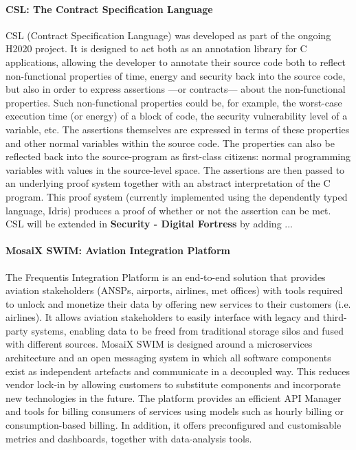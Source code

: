 \documentclass[a4paper,11pt]{article}
\newcommand{\project}[1]{\textbf{#1}\xspace}
\newcommand{\SECURITY}{\project{Security - Digital Fortress}}
\newcommand{\TheProject}{\SECURITY}
\begin{document}
\paragraph {\SAshort{} CSL: The Contract Specification Language}
CSL (Contract Specification Language) was developed as part of the ongoing H2020 \teamplay{} project. It is designed to act both as an annotation library for C applications, allowing the developer to annotate their source code both to reflect non-functional properties of time, energy and security back into the source code, but also in order to express assertions ---or contracts--- about the non-functional properties. Such non-functional properties could be, for example, the worst-case execution time (or energy) of a block of code, the security vulnerability level of a variable, etc. The assertions themselves are expressed in terms of these properties and other normal variables within the source code. The properties can also be reflected back into the source-program as first-class citizens: normal programming variables with values in the source-level space.
The assertions are then passed to an underlying proof system together with an abstract interpretation of the C program. This proof system (currently implemented using the dependently typed language, Idris) produces  a proof of whether or not the assertion can be met. CSL will be extended in \TheProject{} by adding ... 

\paragraph{\FRQshort{} MosaiX SWIM: Aviation Integration Platform}
\label{sec:swim}
The Frequentis Integration Platform is an end-to-end solution that provides aviation stakeholders (ANSPs, airports, airlines, met offices) with tools required to unlock and monetize their data by offering new services to their customers (i.e. airlines). It allows aviation stakeholders to easily interface with legacy and third-party systems, enabling data to be freed from traditional storage silos and fused with different sources. MosaiX SWIM is designed around a microservices architecture and an open messaging system in which all software components exist as independent artefacts and communicate in a decoupled way. This reduces vendor lock-in by allowing customers to substitute components and incorporate new technologies in the future. The platform provides an efficient API Manager and tools for billing consumers of services using models such as hourly billing or consumption-based billing. In addition, it offers preconfigured and customisable metrics and dashboards, together with data-analysis tools.
\end{document}
